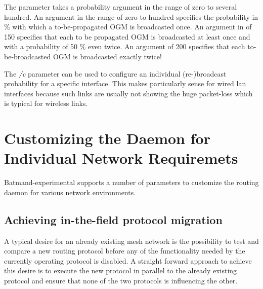 \documentclass[11pt]{article}
\begin{document}
The parameter takes a probability argument in the range of zero to several hundred.
%
An argument in the range of zero to hundred specifies the probability in \% with which a to-be-propagated OGM is broadcasted once.
%
An argument in of 150 specifies that each to be propagated OGM is broadcasted at least once and with a probability of 50 \% even twice.
%
An argument of 200 specifies that each to-be-broadcasted OGM is broadcasted exactly twice!

The \emph{/c} parameter can be used to configure an individual (re-)broadcast probability for a specific interface. 
This makes particularly sense for wired lan interfaces because such links are usually not showing the huge packet-loss which is typical for wireless links.

%


\section{Customizing the Daemon for Individual Network Requiremets}
\label{system-adaption}

Batmand-experimental supports a number of parameters to customize the routing daemon for various network environments.




\subsection{Achieving in-the-field protocol migration}
A typical desire for an already existing mesh network is the possibility to test and compare a new routing protocol before any of the functionality needed by the currently operating protocol is disabled.
%
A straight forward approach to achieve this desire is to execute the new protocol in parallel to the already existing protocol and ensure that none of the two protocols is influencing the other. 
%
\end{document}
